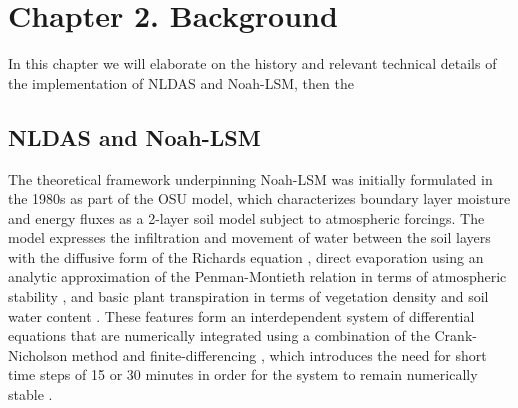 \chapter{Chapter 2. Background}

In this chapter we will elaborate on the history and relevant technical details of the implementation of NLDAS and Noah-LSM, then the

\section{NLDAS and Noah-LSM}

The theoretical framework underpinning Noah-LSM was initially formulated in the 1980s as part of the OSU model, which characterizes boundary layer moisture and energy fluxes as a 2-layer soil model subject to atmospheric forcings. The model expresses the infiltration and movement of water between the soil layers with the diffusive form of the Richards equation \citep{mahrt_two-layer_1984}, direct evaporation using an analytic approximation of the Penman-Montieth relation in terms of atmospheric stability \citep{mahrt_influence_1984}, and basic plant transpiration in terms of vegetation density and soil water content \citep{pan_interaction_1987}. These features form an interdependent system of differential equations that are numerically integrated using a combination of the Crank-Nicholson method and finite-differencing \citep{chen_impact_1997}, which introduces the need for short time steps of 15 or 30 minutes in order for the system to remain numerically stable \citep{cartwright_dynamics_1992}\citep{mahrt_two-layer_1984}.

